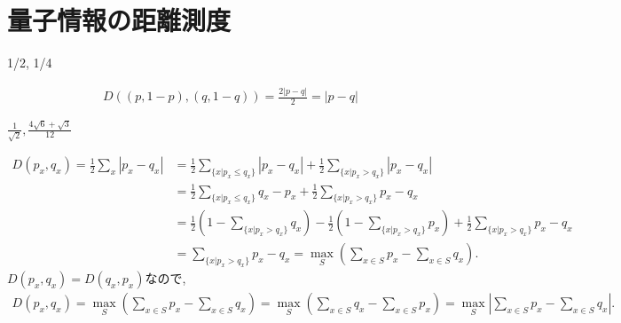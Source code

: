 \chapter{量子情報の距離測度}

\begin{ex}
    \label{ex9.1}
    1/2, 1/4
\end{ex}

\begin{ex}
    \label{ex9.2}
    \begin{align*}
        D((p, 1-p),(q, 1-q) ) = \frac{2\left| p - q\right|}{2} = \left| p - q\right|
    \end{align*}
\end{ex}

\begin{ex}
    \label{ex9.3}
    $\frac{1}{\sqrt{2}}, \frac{4 \sqrt{6} + \sqrt{3}}{12}$
\end{ex}

\begin{ex}
    \label{ex9.4}
    \begin{align*}
        D\left(p_x , q_x\right)
        =
        \frac{1}{2} \sum_x \left| p_x - q_x \right|
         & =
        \frac{1}{2} \sum_{\{x|p_x \leq q_x\}} \left| p_x - q_x \right|
        +
        \frac{1}{2} \sum_{\{x|p_x > q_x\}} \left| p_x - q_x \right|
        \\
         & =
        \frac{1}{2} \sum_{\{x|p_x \leq q_x\}}  q_x - p_x
        +
        \frac{1}{2} \sum_{\{x|p_x > q_x\}} p_x - q_x
        \\
         & =
        \frac{1}{2} \left( 1 -\sum_{\{x|p_x > q_x\}}  q_x  \right)
        -
        \frac{1}{2} \left( 1 -\sum_{\{x|p_x > q_x\}}  p_x  \right)
        +
        \frac{1}{2} \sum_{\{x|p_x > q_x\}} p_x - q_x
        \\
         & =
        \sum_{\{x|p_x > q_x\}} p_x - q_x
        =
        \max_S
        \left(\sum_{x \in S} p_x - \sum_{x \in S} q_x \right).
    \end{align*}
    $D\left(p_x , q_x\right) = D\left(q_x , p_x\right)$なので,
    \begin{align*}
        D\left(p_x , q_x\right)
        =
        \max_S \left(\sum_{x \in S} p_x - \sum_{x \in S} q_x \right)
        =
        \max_S
        \left(\sum_{x \in S} q_x - \sum_{x \in S} p_x \right)
        =
        \max_S
        \left|\sum_{x \in S} p_x - \sum_{x \in S} q_x \right|.
    \end{align*}
\end{ex}

